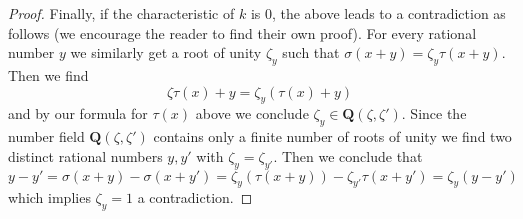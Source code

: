 \begin{proof}
\medskip\noindent
Finally, if the characteristic of $k$ is $0$, the above leads to a
contradiction as follows (we encourage the reader to find their own proof).
For every rational number $y$ we similarly get a root of unity
$\zeta_y$ such that $\sigma(x + y) = \zeta_y\tau(x + y)$.
Then we find
$$
\zeta \tau(x) + y = \zeta_y(\tau(x) + y)
$$
and by our formula for $\tau(x)$ above we conclude
$\zeta_y \in \mathbf{Q}(\zeta, \zeta')$. Since the number field
$\mathbf{Q}(\zeta, \zeta')$ contains only a finite number of roots of
unity we find two distinct rational numbers $y, y'$ with
$\zeta_y = \zeta_{y'}$. Then we conclude that
$$
y - y' =
\sigma(x + y) - \sigma(x + y') =
\zeta_y(\tau(x + y)) - \zeta_{y'}\tau(x + y') = \zeta_y(y - y')
$$
which implies $\zeta_y = 1$ a contradiction.
\end{proof}